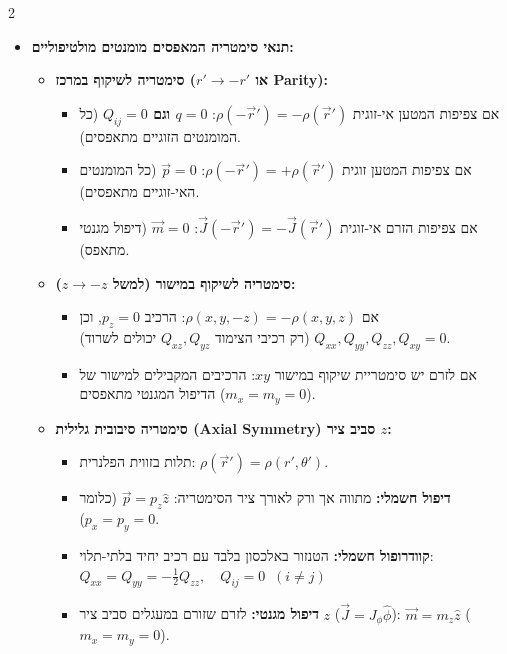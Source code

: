 \documentclass[10pt,a4paper]{article}
\begin{document}
\begin{multicols*}{2}
\begin{itemize}[leftmargin=*]
    \item \textbf{תנאי סימטריה המאפסים מומנטים מולטיפוליים:}

    \begin{itemize}
        \item \textbf{סימטריה לשיקוף במרכז ($r' \to -r'$ או \textenglish{Parity}):}
        \begin{itemize}
            \item אם צפיפות המטען אי-זוגית $\rho(-\vec{r}') = -\rho(\vec{r}')$: \textbf{$q = 0$ וגם $Q_{ij} = 0$} (כל המומנטים הזוגיים מתאפסים).
            \item אם צפיפות המטען זוגית $\rho(-\vec{r}') = +\rho(\vec{r}')$: \textbf{$\vec{p} = 0$} (כל המומנטים האי-זוגיים מתאפסים).
            \item אם צפיפות הזרם אי-זוגית $\vec{J}(-\vec{r}') = -\vec{J}(\vec{r}')$: \textbf{$\vec{m} = 0$} (דיפול מגנטי מתאפס).
        \end{itemize}

        \item \textbf{סימטריה לשיקוף במישור (למשל $z \to -z$):}
        \begin{itemize}
            \item אם $\rho(x,y,-z) = -\rho(x,y,z)$: הרכיב $p_z = 0$, וכן $Q_{xx}, Q_{yy}, Q_{zz}, Q_{xy} = 0$ (רק רכיבי הצימוד $Q_{xz}, Q_{yz}$ יכולים לשרוד).
            \item אם לזרם יש סימטריית שיקוף במישור $xy$: הרכיבים המקבילים למישור של הדיפול המגנטי מתאפסים ($m_x = m_y = 0$).
        \end{itemize}

        \item \textbf{סימטריה סיבובית גלילית \textenglish{(Axial Symmetry)} סביב ציר $z$:}
        \begin{itemize}
            \item תלות בזווית הפלנרית: $\rho(\vec{r}') = \rho(r', \theta')$.
            \item \textbf{דיפול חשמלי:} מתווה אך ורק לאורך ציר הסימטריה: $\vec{p} = p_z \hat{z}$ (כלומר $p_x = p_y = 0$).
            \item \textbf{קוודרופול חשמלי:} הטנזור באלכסון בלבד עם רכיב יחיד בלתי-תלוי:
            $Q_{xx} = Q_{yy} = -\frac{1}{2} Q_{zz}, \quad Q_{ij} = 0 \;\; (i \neq j)$
            \item \textbf{דיפול מגנטי:} לזרם שזורם במעגלים סביב ציר $z$ ($\vec{J} = J_\phi \hat{\phi}$): $\vec{m} = m_z \hat{z}$ ($m_x = m_y = 0$).
        \end{itemize}


\end{itemize}
\end{itemize}
\end{multicols*}
\end{document}
